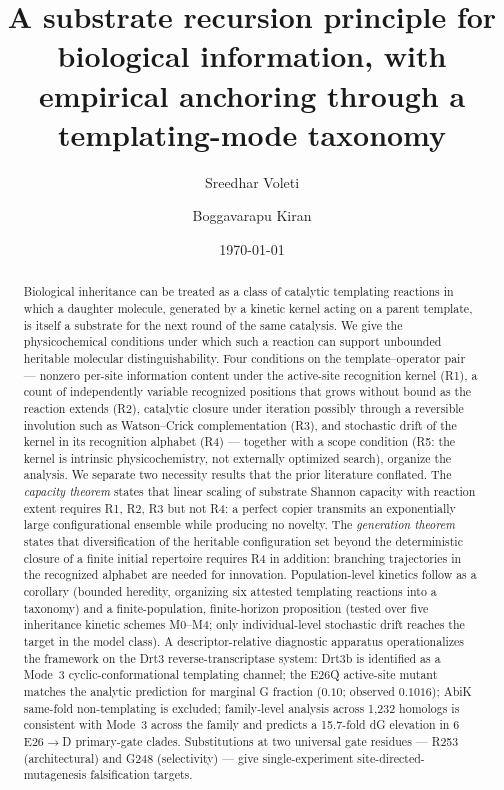 \documentclass[aps,prx,reprint,amsmath,amssymb,floatfix,superscriptaddress,nofootinbib]{revtex4-2}
\theoremstyle{plain-thm}
\theoremstyle{definition-thm}
\begin{document}
\title{A substrate recursion principle for biological information, with empirical anchoring through a templating-mode taxonomy}

\author{Sreedhar Voleti}

\author{Boggavarapu Kiran}

\date{\today}

\begin{abstract}
Biological inheritance can be treated as a class of catalytic templating reactions in which a daughter molecule, generated by a kinetic kernel acting on a parent template, is itself a substrate for the next round of the same catalysis. We give the physicochemical conditions under which such a reaction can support unbounded heritable molecular distinguishability. Four conditions on the template--operator pair --- nonzero per-site information content under the active-site recognition kernel (R1), a count of independently variable recognized positions that grows without bound as the reaction extends (R2), catalytic closure under iteration possibly through a reversible involution such as Watson--Crick complementation (R3), and stochastic drift of the kernel in its recognition alphabet (R4) --- together with a scope condition (R5: the kernel is intrinsic physicochemistry, not externally optimized search), organize the analysis. We separate two necessity results that the prior literature conflated. The \emph{capacity theorem} states that linear scaling of substrate Shannon capacity with reaction extent requires R1, R2, R3 but not R4: a perfect copier transmits an exponentially large configurational ensemble while producing no novelty. The \emph{generation theorem} states that diversification of the heritable configuration set beyond the deterministic closure of a finite initial repertoire requires R4 in addition: branching trajectories in the recognized alphabet are needed for innovation. Population-level kinetics follow as a corollary (bounded heredity, organizing six attested templating reactions into a taxonomy) and a finite-population, finite-horizon proposition (tested over five inheritance kinetic schemes M0--M4; only individual-level stochastic drift reaches the target in the model class). A descriptor-relative diagnostic apparatus operationalizes the framework on the Drt3 reverse-transcriptase system: Drt3b is identified as a Mode~3 cyclic-conformational templating channel; the E26Q active-site mutant matches the analytic prediction for marginal G fraction ($0.10$; observed $0.1016$); AbiK same-fold non-templating is excluded; family-level analysis across 1{,}232 homologs is consistent with Mode~3 across the family and predicts a 15.7-fold dG elevation in 6 E26$\to$D primary-gate clades. Substitutions at two universal gate residues --- R253 (architectural) and G248 (selectivity) --- give single-experiment site-directed-mutagenesis falsification targets.
\end{abstract}
\end{document}
